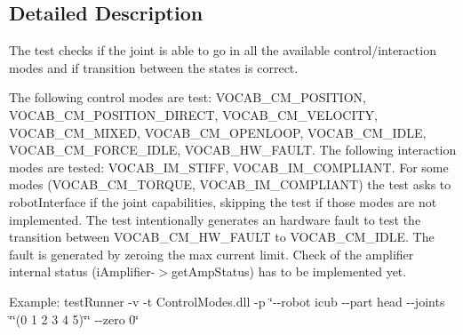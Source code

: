 \subsection{Detailed Description}
The test checks if the joint is able to go in all the available control/interaction modes and if transition between the states is correct. 

The following control modes are test\+: V\+O\+C\+A\+B\+\_\+\+C\+M\+\_\+\+P\+O\+S\+I\+T\+I\+ON, V\+O\+C\+A\+B\+\_\+\+C\+M\+\_\+\+P\+O\+S\+I\+T\+I\+O\+N\+\_\+\+D\+I\+R\+E\+CT, V\+O\+C\+A\+B\+\_\+\+C\+M\+\_\+\+V\+E\+L\+O\+C\+I\+TY, V\+O\+C\+A\+B\+\_\+\+C\+M\+\_\+\+M\+I\+X\+ED, V\+O\+C\+A\+B\+\_\+\+C\+M\+\_\+\+O\+P\+E\+N\+L\+O\+OP, V\+O\+C\+A\+B\+\_\+\+C\+M\+\_\+\+I\+D\+LE, V\+O\+C\+A\+B\+\_\+\+C\+M\+\_\+\+F\+O\+R\+C\+E\+\_\+\+I\+D\+LE, V\+O\+C\+A\+B\+\_\+\+H\+W\+\_\+\+F\+A\+U\+LT. The following interaction modes are tested\+: V\+O\+C\+A\+B\+\_\+\+I\+M\+\_\+\+S\+T\+I\+FF, V\+O\+C\+A\+B\+\_\+\+I\+M\+\_\+\+C\+O\+M\+P\+L\+I\+A\+NT. For some modes (V\+O\+C\+A\+B\+\_\+\+C\+M\+\_\+\+T\+O\+R\+Q\+UE, V\+O\+C\+A\+B\+\_\+\+I\+M\+\_\+\+C\+O\+M\+P\+L\+I\+A\+NT) the test asks to robot\+Interface if the joint capabilities, skipping the test if those modes are not implemented. The test intentionally generates an hardware fault to test the transition between V\+O\+C\+A\+B\+\_\+\+C\+M\+\_\+\+H\+W\+\_\+\+F\+A\+U\+LT to V\+O\+C\+A\+B\+\_\+\+C\+M\+\_\+\+I\+D\+LE. The fault is generated by zeroing the max current limit. Check of the amplifier internal status (i\+Amplifier-\/$>$get\+Amp\+Status) has to be implemented yet.

Example\+: test\+Runner -\/v -\/t Control\+Modes.\+dll -\/p \char`\"{}-\/-\/robot icub -\/-\/part head -\/-\/joints \char`\"{}\char`\"{}(0 1 2 3 4 5)\char`\"{}\char`\"{} -\/-\/zero 0\char`\"{}

